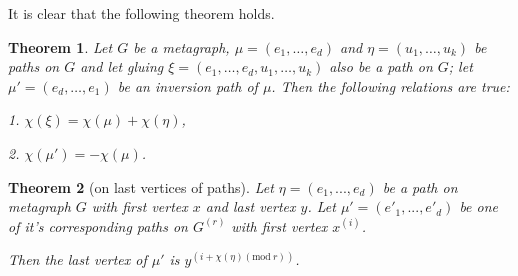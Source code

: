 \documentclass[leqno]{aadmbook}
\newtheorem{theorem}{Theorem}
\renewcommand{\mod}[1]{\textrm{mod}\ #1}
\begin{document}
It is clear that the following theorem holds.

\begin{theorem} \label{glued_paths}
    Let $G$ be a metagraph, $\mu = (e_1, \dots, e_d)$ and $\eta = (u_1, \dots, u_k)$ be paths on $G$ and let gluing $\xi = (e_1, \dots, e_d, u_1, \dots, u_k)$ also be a path on $G$; let $\mu' = (e_d, \dots, e_1)$ be an inversion path of $\mu$. Then the following relations are true:

    1. $ \chi(\xi) = \chi(\mu) + \chi(\eta)$,

    2. $ \chi(\mu') = -\chi(\mu)$.
\end{theorem}

\begin{theorem}[on last vertices of paths]\label{theorem_last_vertices}
    Let $\eta = (e_1, ..., e_d)$ be a path on metagraph $G$ with first vertex $x$ and last vertex $y$. Let $\mu' = (e'_1, ..., e'_d)$ be one of it's corresponding paths on $G^{(r)}$ with first vertex $x^{(i)}$.
    
    Then the last vertex of $\mu'$ is $y^{(i + \chi(\eta) (\mod{r}))}$.
    
\end{theorem}
    
\end{document}
